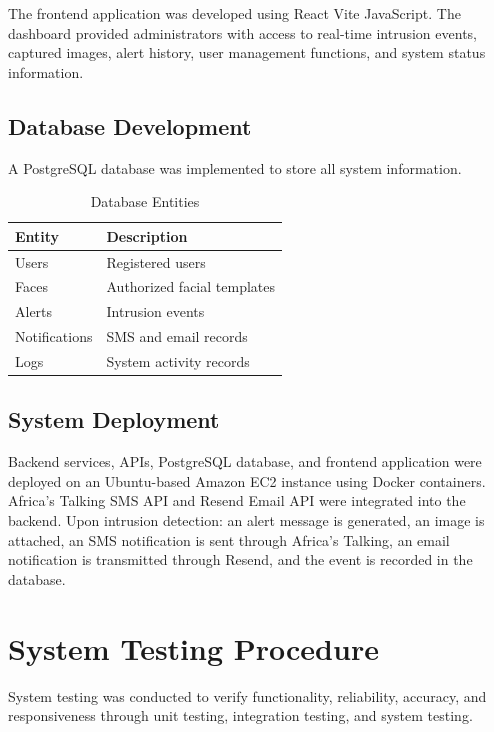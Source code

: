 \documentclass[12pt,a4paper,oneside]{report}
\begin{document}
The frontend application was developed using React Vite JavaScript. The dashboard provided administrators with access to real-time intrusion events, captured images, alert history, user management functions, and system status information.

\subsection{Database Development}

A PostgreSQL database was implemented to store all system information.

\begin{table}[htbp]
  \centering
  \caption{Database Entities}
  {\small
  \begin{tabular}{|p{4.00cm}|p{9.00cm}|}
    \hline
    \textbf{Entity} & \textbf{Description} \\
    \hline
    Users         & Registered users \\
    Faces         & Authorized facial templates \\
    Alerts        & Intrusion events \\
    Notifications & SMS and email records \\
    Logs          & System activity records \\
    \hline
  \end{tabular}
  }
\end{table}

\subsection{System Deployment}

Backend services, APIs, PostgreSQL database, and frontend application were deployed on an Ubuntu-based Amazon EC2 instance using Docker containers. Africa's Talking SMS API and Resend Email API were integrated into the backend. Upon intrusion detection: an alert message is generated, an image is attached, an SMS notification is sent through Africa's Talking, an email notification is transmitted through Resend, and the event is recorded in the database.

\section{System Testing Procedure}

System testing was conducted to verify functionality, reliability, accuracy, and responsiveness through unit testing, integration testing, and system testing.
\end{document}
